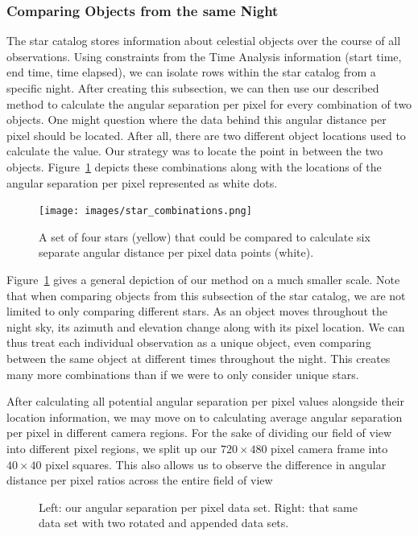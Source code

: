 \subsubsection{Comparing Objects from the same Night}

The star catalog stores information about celestial objects over the course of all observations.
Using constraints from the Time Analysis information (start time, end time, time elapsed), we can isolate rows within the star catalog from a specific night.  
After creating this subsection, we can then use our described method to calculate the angular separation per pixel for every combination of two objects.
One might question where the data behind this angular distance per pixel should be located.
After all, there are two different object locations used to calculate the value.
Our strategy was to locate the point in between the two objects.  
Figure~\ref{starcombos} depicts these combinations along with the locations of the angular separation per pixel represented as white dots.

\begin{figure}[ht!]
  \centering
  \texttt{[image: images/star\_combinations.png]}
  \caption{A set of four stars (yellow) that could be compared to calculate six separate angular distance per pixel data points (white).}
  \label{starcombos}
\end{figure}

Figure~\ref{starcombos} gives a general depiction of our method on a much smaller scale.
Note that when comparing objects from this subsection of the star catalog, we are not limited to only comparing different stars.
As an object moves throughout the night sky, its azimuth and elevation change along with its pixel location.
We can thus treat each individual observation as a unique object, even comparing between the same object at different times throughout the night.
This creates many more combinations than if we were to only consider unique stars.

After calculating all potential angular separation per pixel values alongside their location information, we may move on to calculating average angular separation per pixel in different camera regions.
For the sake of dividing our field of view into different pixel regions, we split up our $720 \times 480$ pixel camera frame into $40 \times 40$ pixel squares.
This also allows us to observe the difference in angular distance per pixel ratios across the entire field of view

\begin{figure}[h]
  \centering
  \caption{Left: our angular separation per pixel data set. Right: that same data set with two rotated and appended data sets.}
  \label{rotate}
\end{figure}



